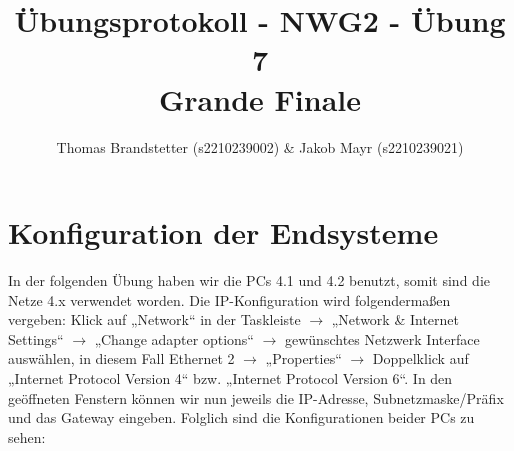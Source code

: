 \documentclass{article}
\title{Übungsprotokoll - NWG2 - Übung 7 \\ Grande Finale}
\author{\vspace{0.5cm} Thomas Brandstetter (s2210239002) \& Jakob Mayr (s2210239021)}
\begin{document}
\maketitle

\section{Konfiguration der Endsysteme}

In der folgenden Übung haben wir die PCs 4.1 und 4.2 benutzt, somit sind die Netze 4.x verwendet worden. Die IP-Konfiguration wird folgendermaßen vergeben: Klick auf „Network“ in der Taskleiste $\rightarrow$ „Network \& Internet Settings“ $\rightarrow$ „Change adapter options“ $\rightarrow$ gewünschtes Netzwerk Interface auswählen, in diesem Fall Ethernet 2 $\rightarrow$ „Properties“ $\rightarrow$ Doppelklick auf „Internet Protocol Version 4“ bzw. „Internet Protocol Version 6“. In den geöffneten Fenstern können wir nun jeweils die IP-Adresse, Subnetzmaske/Präfix und das Gateway eingeben. Folglich sind die Konfigurationen beider PCs zu sehen:
\end{document}
